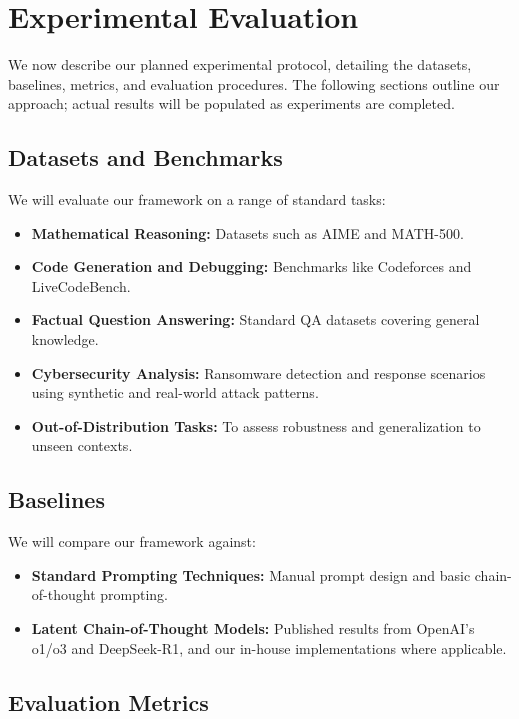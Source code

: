 \documentclass[10pt,journal,compsoc]{IEEEtran}
\begin{document}
\section{Experimental Evaluation}

We now describe our planned experimental protocol, detailing the
datasets, baselines, metrics, and evaluation procedures. The following
sections outline our approach; actual results will be populated as
experiments are completed.


\subsection{Datasets and Benchmarks}

We will evaluate our framework on a range of standard tasks:
\begin{itemize}
\item \textbf{Mathematical Reasoning:} Datasets such as AIME and MATH-500.
\item \textbf{Code Generation and Debugging:} Benchmarks like Codeforces and LiveCodeBench.
\item \textbf{Factual Question Answering:} Standard QA datasets covering general knowledge.
\item \textbf{Cybersecurity Analysis:} Ransomware detection and response scenarios using synthetic and real-world attack patterns.
\item \textbf{Out-of-Distribution Tasks:} To assess robustness and generalization to unseen contexts.
\end{itemize}

\subsection{Baselines}

We will compare our framework against:
\begin{itemize}
\item \textbf{Standard Prompting Techniques:} Manual prompt design and basic chain-of-thought prompting.
\item \textbf{Latent Chain-of-Thought Models:} Published results from OpenAI's o1/o3 and DeepSeek-R1, and our in-house implementations where applicable.
\end{itemize}

\subsection{Evaluation Metrics}
\end{document}
